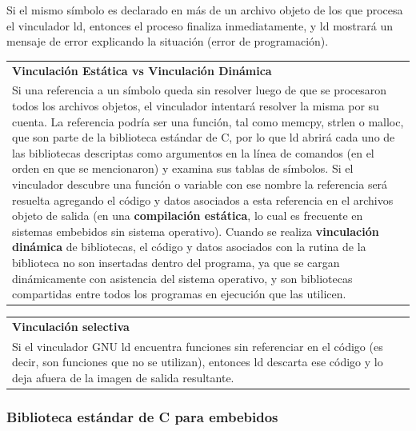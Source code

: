 \documentclass[output=paper, 
colorlinks,
citecolor=brown,
newtxmath
]{langscibook}
\begin{document}
Si el mismo símbolo es declarado en más de un archivo objeto de los que 
procesa el vinculador ld, entonces el proceso finaliza inmediatamente, y ld mostrará
un mensaje de error explicando la situación (error de programación).

\begin{center}
\begin{tabularx}{0.95\textwidth}{|X|}
\hline
\rowcolor{lightgray}
\textbf{Vinculación Estática vs Vinculación Dinámica}\\
Si una referencia a un símbolo queda sin resolver luego de
que se procesaron todos los archivos objetos, el vinculador intentará 
resolver la misma por su cuenta.
La referencia podría ser una función, tal como memcpy, strlen o malloc, que son
parte de la biblioteca estándar de C, por lo que ld abrirá cada uno de las
bibliotecas descriptas como argumentos en la línea de comandos (en el orden
en que se mencionaron) y examina sus tablas de símbolos. 
Si el vinculador descubre una función o variable con ese nombre la referencia
será resuelta agregando el código y datos asociados a esta referencia en el 
archivos objeto de salida (en una \textbf{compilación estática}, lo cual es
frecuente en sistemas embebidos sin sistema operativo). 
Cuando se realiza \textbf{vinculación dinámica} de bibliotecas, el código 
y datos asociados con la rutina de la biblioteca no son insertadas dentro
del programa, ya que se cargan dinámicamente con asistencia
del sistema operativo, y son bibliotecas compartidas entre todos
los programas en ejecución que las utilicen.\\
\hline
\end{tabularx}
\end{center}

\begin{center}
\begin{tabularx}{\textwidth}{|X|}
\hline
\rowcolor{lightgray}
\textbf{Vinculación selectiva}\\
Si el vinculador GNU ld encuentra funciones sin referenciar en el código
(es decir, son funciones que no se utilizan), entonces ld descarta ese código y lo deja
afuera de la imagen de salida resultante.\\
\hline
\end{tabularx}
\end{center}

\subsubsection*{Biblioteca estándar de C para embebidos}
\end{document}
